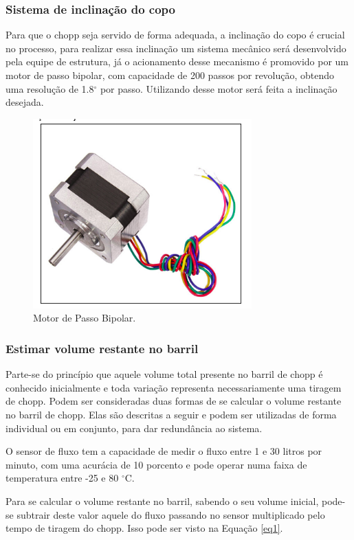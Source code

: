 			\subsubsection[Sistema de inclinação do copo]{Sistema de inclinação do copo}
				Para que o chopp seja servido de forma adequada, a inclinação do copo é crucial no processo, para realizar essa inclinação um sistema mecânico será desenvolvido pela equipe de estrutura, já o acionamento desse mecanismo é promovido por um motor de passo bipolar, com capacidade de 200 passos por revolução, obtendo uma resolução de 1.8$^{\circ}$ por passo. Utilizando desse motor será feita a inclinação desejada.

			\begin{figure}[H]
				\centering
				\includegraphics[scale= 0.7]{figuras/motor-passo.png}
				\caption{Motor de Passo Bipolar.}
				\label{motor-passo}
			\end{figure}
			
			\subsubsection[Estimar volume restante no barril]{Estimar volume restante no barril}
				Parte-se do princípio que aquele volume total presente no barril de chopp é conhecido inicialmente e toda variação representa necessariamente uma tiragem de chopp. Podem ser consideradas duas formas de se calcular o volume restante no barril de chopp. Elas são descritas a seguir e podem ser utilizadas de forma individual ou em conjunto, para dar redundância ao sistema. 

				O sensor de fluxo tem a capacidade de  medir o fluxo entre 1 e 30 litros  por minuto, com uma acurácia de 10 porcento e pode operar   numa faixa de temperatura entre -25 e 80 $^{\circ}$C.

				Para se calcular o volume restante no barril, sabendo o seu volume inicial, pode-se subtrair deste valor aquele do fluxo passando no sensor multiplicado pelo tempo de tiragem do chopp. Isso pode ser visto na Equação \ref{eq1}.

